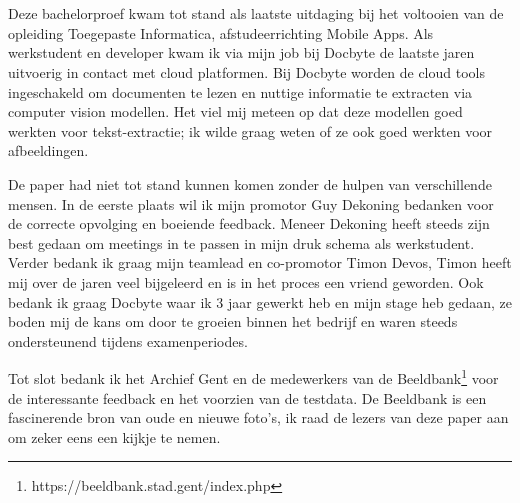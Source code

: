 
\chapter*{}
\label{ch:voorwoord}


Deze bachelorproef kwam tot stand als laatste uitdaging bij het voltooien van de opleiding Toegepaste Informatica, afstudeerrichting Mobile Apps. Als werkstudent en developer kwam ik via mijn job bij Docbyte de laatste jaren uitvoerig in contact met cloud platformen. Bij Docbyte worden de cloud tools ingeschakeld om documenten te lezen en nuttige informatie te extracten via computer vision modellen. Het viel mij meteen op dat deze modellen goed werkten voor tekst-extractie; ik wilde graag weten of ze ook goed werkten voor afbeeldingen.

De paper had niet tot stand kunnen komen zonder de hulpen van verschillende mensen. In de eerste plaats wil ik mijn promotor Guy Dekoning bedanken voor de correcte opvolging en boeiende feedback. Meneer Dekoning heeft steeds zijn best gedaan om meetings in te passen in mijn druk schema als werkstudent. Verder bedank ik graag mijn teamlead en co-promotor Timon Devos, Timon heeft mij over de jaren veel bijgeleerd en is in het proces een vriend geworden. Ook bedank ik graag Docbyte waar ik 3 jaar gewerkt heb en mijn stage heb gedaan, ze boden mij de kans om door te groeien binnen het bedrijf en waren steeds ondersteunend tijdens examenperiodes. 

Tot slot bedank ik het Archief Gent en de medewerkers van de Beeldbank\footnote{https://beeldbank.stad.gent/index.php} voor de interessante feedback en het voorzien van de testdata. De Beeldbank is een fascinerende bron van oude en nieuwe foto's, ik raad de lezers van deze paper aan om zeker eens een kijkje te nemen.